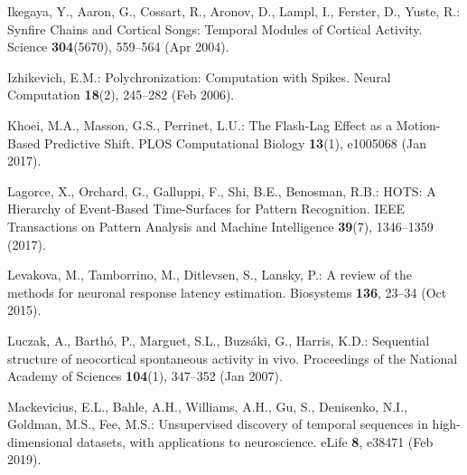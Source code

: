 \documentclass[runningheads]{llncs}
\begin{document}
\begin{thebibliography}{10}
  Ikegaya, Y., Aaron, G., Cossart, R., Aronov, D., Lampl, I., Ferster, D., Yuste, R.: Synfire {Chains} and {Cortical} {Songs}: {Temporal} {Modules} of {Cortical} {Activity}. Science  \textbf{304}(5670),  559--564 (Apr 2004). %
  
  Izhikevich, E.M.: Polychronization: {Computation} with {Spikes}. Neural Computation  \textbf{18}(2),  245--282 (Feb 2006). %
  
  Khoei, M.A., Masson, G.S., Perrinet, L.U.: The {Flash}-{Lag} {Effect} as a {Motion}-{Based} {Predictive} {Shift}. PLOS Computational Biology  \textbf{13}(1),  e1005068 (Jan 2017). %
  
  Lagorce, X., Orchard, G., Galluppi, F., Shi, B.E., Benosman, R.B.: {HOTS}: {A} {Hierarchy} of {Event}-{Based} {Time}-{Surfaces} for {Pattern} {Recognition}. IEEE Transactions on Pattern Analysis and Machine Intelligence  \textbf{39}(7),  1346--1359 (2017). %
  
  Levakova, M., Tamborrino, M., Ditlevsen, S., Lansky, P.: A review of the methods for neuronal response latency estimation. Biosystems  \textbf{136},  23--34 (Oct 2015). %
  
  Luczak, A., Barthó, P., Marguet, S.L., Buzsáki, G., Harris, K.D.: Sequential structure of neocortical spontaneous activity in vivo. Proceedings of the National Academy of Sciences  \textbf{104}(1),  347--352 (Jan 2007). %
  
  Mackevicius, E.L., Bahle, A.H., Williams, A.H., Gu, S., Denisenko, N.I., Goldman, M.S., Fee, M.S.: Unsupervised discovery of temporal sequences in high-dimensional datasets, with applications to neuroscience. eLife  \textbf{8},  e38471 (Feb 2019). %
  

\end{thebibliography}
\end{document}
